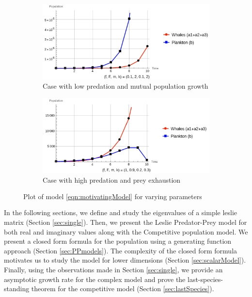 \documentclass[11pt,reqno]{amsart}
\numberwithin{equation}{section}
\theoremstyle{plain}
\begin{document}
\begin{figure}[htp]
    \centering
    \begin{subfigure}[b]{0.45\textwidth}
        \includegraphics[width=\textwidth]{WP_real.png}
        \caption{Case with low predation and mutual population growth}
        \label{fig:Mot1}
    \end{subfigure}
    \hfill
    \begin{subfigure}[b]{0.45\textwidth}
        \includegraphics[width=\textwidth]{WP_unreal.png}
        \caption{Case with high predation and prey exhaustion}
        \label{fig:Mot2}
    \end{subfigure}
    \caption{Plot of model \ref{eqn:motivatingModel} for varying parameters}
    \label{fig:overall}
\end{figure}


In the following sections, we define and study the eigenvalues of a simple
leslie matrix (Section \ref{sec:single}). Then, we present the Leslie Predator-Prey model 
for both real and imaginary values along with the Competitive population model. We present a closed form formula for 
the population using a generating function approach (Section \ref{sec:PPmodels}). The complexity of 
the closed form formula motivates us to study the model for lower dimensions 
(Section \ref{sec:scalarModel}). Finally, using the observations made in Section \ref{sec:single}, we provide an 
asymptotic growth rate for the complex model and prove the last-species-standing 
theorem for the competitive model (Section \ref{sec:lastSpecies}). 
\end{document}
